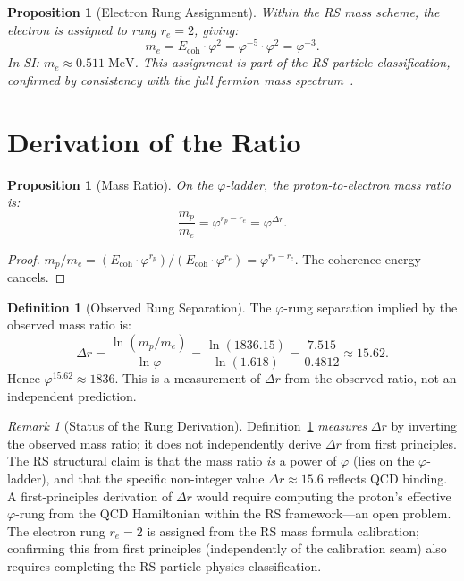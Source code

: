 \documentclass[12pt,a4paper]{article}
\newtheorem{proposition}[theorem]{Proposition}
\theoremstyle{definition}
\newtheorem{definition}[theorem]{Definition}
\theoremstyle{remark}
\newtheorem{remark}[theorem]{Remark}
\begin{document}
\begin{proposition}[Electron Rung Assignment]
\label{thm:electron}
Within the RS mass scheme, the electron is assigned to rung $r_e = 2$,
giving:
\begin{equation}
  m_e = E_{\mathrm{coh}} \cdot \varphi^2
  = \varphi^{-5} \cdot \varphi^2 = \varphi^{-3}.
\end{equation}
In SI: $m_e \approx 0.511\;\mathrm{MeV}$.  This assignment is part of
the RS particle classification, confirmed by consistency with the full
fermion mass spectrum~\cite{RS_Axioms}.
\end{proposition}

\section{Derivation of the Ratio}
\label{sec:derivation}

\begin{proposition}[Mass Ratio]
\label{thm:ratio}
On the $\varphi$-ladder, the proton-to-electron mass ratio is:
\begin{equation}
  \boxed{\frac{m_p}{m_e} = \varphi^{r_p - r_e}
  = \varphi^{\Delta r}.}
\end{equation}
\end{proposition}

\begin{proof}
$m_p/m_e = (E_{\mathrm{coh}} \cdot \varphi^{r_p})/
(E_{\mathrm{coh}} \cdot \varphi^{r_e})
= \varphi^{r_p - r_e}$.  The coherence energy cancels.
\end{proof}

\begin{definition}[Observed Rung Separation]
\label{thm:numerical}
The $\varphi$-rung separation implied by the observed mass ratio is:
\begin{equation}
  \Delta r = \frac{\ln(m_p/m_e)}{\ln\varphi}
  = \frac{\ln(1836.15)}{\ln(1.618)}
  = \frac{7.515}{0.4812} \approx 15.62.
\end{equation}
Hence $\varphi^{15.62} \approx 1836$.  This is a measurement of
$\Delta r$ from the observed ratio, not an independent prediction.
\end{definition}

\begin{remark}[Status of the Rung Derivation]
\label{rem:rung-status}
Definition~\ref{thm:numerical} \emph{measures} $\Delta r$ by inverting
the observed mass ratio; it does not independently derive $\Delta r$
from first principles.  The RS structural claim is that the mass
ratio \emph{is} a power of $\varphi$ (lies on the $\varphi$-ladder),
and that the specific non-integer value $\Delta r \approx 15.6$
reflects QCD binding.  A first-principles derivation of $\Delta r$
would require computing the proton's effective $\varphi$-rung from
the QCD Hamiltonian within the RS framework---an open problem.
The electron rung $r_e = 2$ is assigned from the RS mass formula
calibration; confirming this from first principles (independently of
the calibration seam) also requires completing the RS particle physics
classification.
\end{remark}
\end{document}

